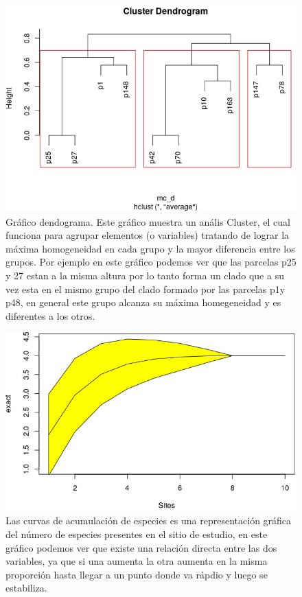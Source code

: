 \documentclass[11pt,]{article}
\begin{document}
\begin{figure}
\centering
\includegraphics{dendograma.jpg}
\caption{Gráfico dendograma. Este gráfico muestra un anális Cluster, el
cual funciona para agrupar elementos (o variables) tratando de lograr la
máxima homogeneidad en cada grupo y la mayor diferencia entre los
grupos. Por ejemplo en este gráfico podemos ver que las parcelas p25 y
27 estan a la misma altura por lo tanto forma un clado que a su vez esta
en el mismo grupo del clado formado por las parcelas p1y p48, en general
este grupo alcanza su máxima homegeneidad y es diferentes a los otros.}
\end{figure}

\begin{figure}
\centering
\includegraphics{grafico amarillo.jpg}
\caption{Las curvas de acumulación de especies es una representación
gráfica del número de especies presentes en el sitio de estudio, en este
gráfico podemos ver que existe una relación directa entre las dos
variables, ya que si una aumenta la otra aumenta en la misma proporción
hasta llegar a un punto donde va rápdio y luego se estabiliza.}
\end{figure}
\end{document}
